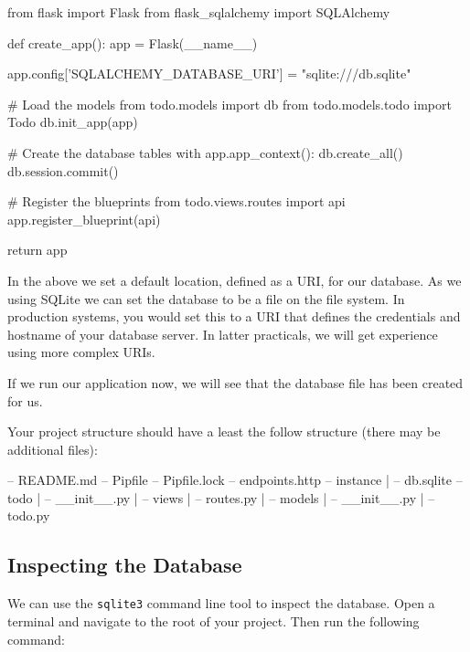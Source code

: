 \documentclass{csse4400}
\begin{document}
\begin{code}[language=python,numbers=none]{}
from flask import Flask
from flask_sqlalchemy import SQLAlchemy

def create_app():
    app = Flask(__name__)

    app.config['SQLALCHEMY_DATABASE_URI'] = "sqlite:///db.sqlite"

    # Load the models
    from todo.models import db
    from todo.models.todo import Todo
    db.init_app(app)

    # Create the database tables
    with app.app_context():
        db.create_all()
        db.session.commit()

    # Register the blueprints
    from todo.views.routes import api
    app.register_blueprint(api)

    return app
\end{code}

In the above we set a default location, defined as a URI, for our database.
As we using SQLite we can set the database to be a file on the file system.
In production systems, you would set this to a URI that defines the credentials and hostname of your database server.
In latter practicals, we will get experience using more complex URIs.

If we run our application now, we will see that the database file has been created for us.

\pagebreak

Your project structure should have a least the follow structure (there may be additional files):

\begin{code}[language=bash,numbers=none]{}
-- README.md
-- Pipfile
-- Pipfile.lock
-- endpoints.http
-- instance
  | -- db.sqlite
-- todo
  | -- __init__.py
  | -- views
      | -- routes.py
  | -- models
      | -- __init__.py
      | -- todo.py
\end{code}

\subsection{Inspecting the Database}

We can use the \texttt{sqlite3} command line tool to inspect the database.
Open a terminal and navigate to the root of your project.
Then run the following command:


\end{document}
